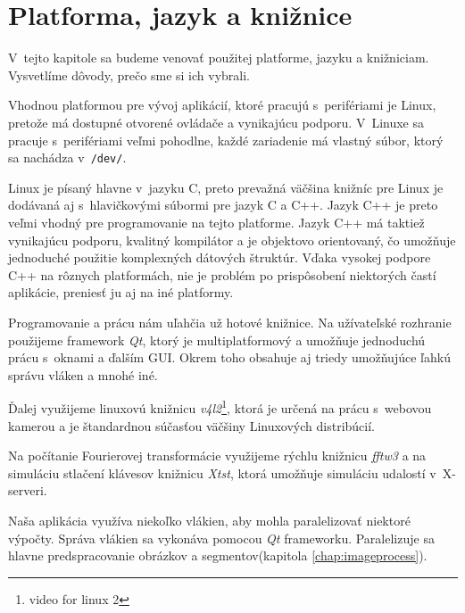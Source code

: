 \chapter{Platforma, jazyk a knižnice}

V~tejto kapitole sa budeme venovať použitej platforme, jazyku a knižniciam. Vysvetlíme dôvody, prečo sme si ich vybrali.
\bigskip

Vhodnou platformou pre vývoj aplikácií, ktoré pracujú s~perifériami je Linux, pretože má dostupné otvorené ovládače a vynikajúcu podporu. V~Linuxe sa pracuje s~perifériami veľmi pohodlne, každé zariadenie má vlastný súbor, ktorý sa nachádza v~{\tt /dev/}.

Linux je písaný hlavne v~jazyku C, preto prevažná väčšina knižníc pre Linux je dodávaná aj s~hlavičkovými súbormi pre jazyk C a C++.
Jazyk C++ je preto veľmi vhodný pre programovanie na tejto platforme. Jazyk C++ má taktiež vynikajúcu podporu, kvalitný kompilátor a je objektovo orientovaný, čo umožňuje jednoduché použitie komplexných dátových štruktúr. Vďaka vysokej podpore C++ na rôznych platformách, nie je problém po prispôsobení niektorých častí aplikácie, preniesť ju aj na iné platformy.

Programovanie a prácu nám uľahčia už hotové knižnice. Na užívateľské rozhranie použijeme framework \textit{Qt}, ktorý je multiplatformový a umožňuje jednoduchú prácu s~oknami a ďalším GUI. Okrem toho obsahuje aj triedy umožňujúce ľahkú správu vláken a mnohé iné.

Ďalej využijeme linuxovú knižnicu \textit{v4l2}\footnote{video for linux 2}, ktorá je určená na prácu s~webovou kamerou a je štandardnou súčasťou väčšiny Linuxových distribúcií.

Na počítanie Fourierovej transformácie využijeme rýchlu knižnicu \textit{fftw3} a na simuláciu stlačení klávesov knižnicu \textit{Xtst}, ktorá umožňuje simuláciu udalostí v~X-serveri.

Naša aplikácia využíva niekoľko vlákien, aby mohla paralelizovať niektoré výpočty. Správa vlákien sa vykonáva pomocou \textit{Qt} frameworku. Paralelizuje sa hlavne predspracovanie obrázkov a segmentov(kapitola \ref{chap:imageprocess}).


